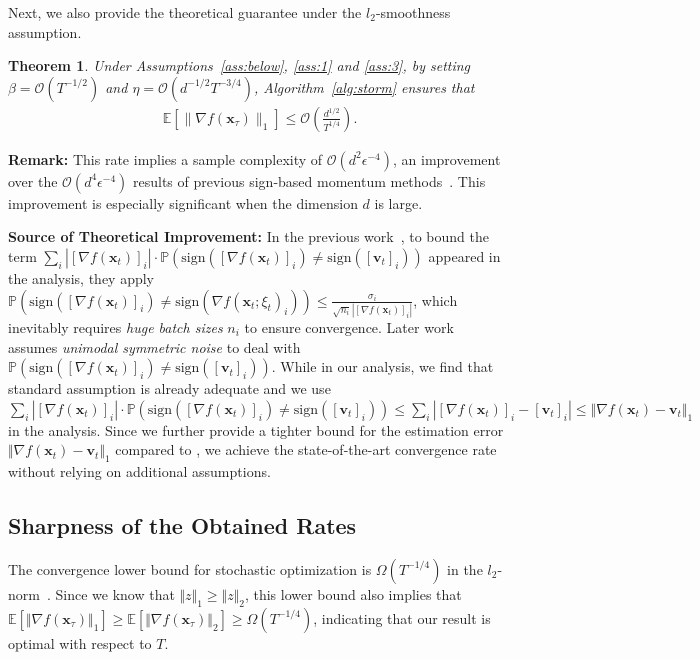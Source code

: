 \documentclass{article}
\newcommand{\E}{\mathbb{E}}
\newtheorem{theorem}{Theorem}[section]
\def \E {\mathbb{E}}
\def \v {\mathbf{v}}
\def \x {\mathbf{x}}
\def \E {\mathbb{E}}
\def \x {\mathbf{x}}
\def \v {\mathbf{v}}
\begin{document}
Next, we also provide the theoretical guarantee under the $l_2$-smoothness assumption.
\begin{theorem}\label{thm1}
Under Assumptions~\ref{ass:below}, \ref{ass:1} and \ref{ass:3}, by setting $\beta = \mathcal{O}\left( T^{-1/2}\right)$ and $\eta = \mathcal{O}\left( d^{-1/2}T^{-3/4}\right)$, Algorithm~\ref{alg:storm} ensures that
\begin{align*}
    \E \left[\|\nabla f(\x_\tau)\|_1 \right] \leq \mathcal{O}\left(\frac{d^{1/2}}{T^{1/4}}\right).
\end{align*}
\end{theorem}
\textbf{Remark:} This rate implies a sample complexity of $\mathcal{O}(d^{2} \epsilon^{-4})$, an improvement over the $\mathcal{O}(d^{4} \epsilon^{-4})$ results of previous sign-based momentum methods~\citep{pmlr-v202-sun23l}. This improvement is especially significant when the dimension $d$ is large.

\noindent\textbf{Source of Theoretical Improvement:} In the previous work~\citep{pmlr-v80-bernstein18a}, to bound the term $\sum_i \left| [\nabla f(\x_t)]_i\right| \cdot \mathbb{P} \left( \text{sign}(\left[\nabla f(\x_t)\right]_i) \neq \text{sign}([\v_t]_i) \right)$ appeared in the analysis, they apply $\mathbb{P} \left( \text{sign}(\left[\nabla f(\x_t)\right]_i) \neq \text{sign}(\nabla f(\x_t;\xi_t)_i) \right) \leq \frac{\sigma_i}{\sqrt{n_i} \left| [\nabla f(\x_t)]_i\right|}$, which inevitably requires \emph{huge batch sizes} $n_i$ to ensure convergence. 
Later work~\citep{bernstein2018signsgd} assumes \emph{unimodal symmetric noise} to deal with $\mathbb{P} \left( \text{sign}(\left[\nabla f(\x_t)\right]_i) \neq \text{sign}([\v_t]_i) \right)$. While in our analysis, we find that standard assumption is already adequate and we use $\sum_i \left| [\nabla f(\x_t)]_i\right| \cdot \mathbb{P} \left( \text{sign}(\left[\nabla f(\x_t)\right]_i) \neq \text{sign}([\v_t]_i) \right) \leq \sum_i |[ \nabla f(\x_t)]_i - [\v_t]_i| \leq \Vert \nabla f(\x_t) - \v_t \Vert_1$ in the analysis. Since we further provide a tighter bound for the estimation error $\Vert \nabla f(\x_t) - \v_t \Vert_1$ compared to \citet{pmlr-v202-sun23l}, we achieve the state-of-the-art convergence rate without relying on additional assumptions.

\subsection{Sharpness of the Obtained Rates} 
The convergence lower bound for stochastic optimization is $\Omega(T^{-1/4})$ in the $l_2$-norm~\citep{Arjevani2019LowerBF}. Since we know that $\Vert z \Vert_1 \ge \Vert z \Vert_2$, this lower bound also implies that $\mathbb{E} [ \Vert \nabla f(\x_\tau) \Vert_1 ] \ge \mathbb{E} [ \Vert \nabla f(\x_\tau) \Vert_2 ] \ge \Omega(T^{-1/4})$, indicating that our result is optimal with respect to $T$. 
\end{document}
